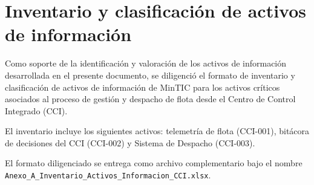 \section{Inventario y clasificación de activos de información}
\label{anexo:inventario-activos}

Como soporte de la identificación y valoración de los activos de información
desarrollada en el presente documento, se diligenció el formato de inventario
y clasificación de activos de información de MinTIC para los activos críticos
asociados al proceso de gestión y despacho de flota desde el Centro de Control
Integrado (CCI).

El inventario incluye los siguientes activos: telemetría de flota
(CCI-001), bitácora de decisiones del CCI (CCI-002) y Sistema de Despacho
(CCI-003).

El formato diligenciado se entrega como archivo complementario bajo el nombre
\texttt{Anexo\_A\_Inventario\_Activos\_Informacion\_CCI.xlsx}.
